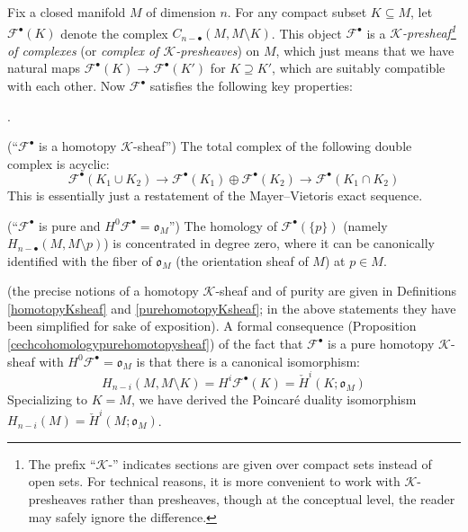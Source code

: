 \documentclass[12pt]{article}
\theoremstyle{definition}
\theoremstyle{remark}
\numberwithin{equation}{subsection}
\newcommand{\F}{\mathcal F}
\newcommand{\K}{\mathcal K}
\newcommand{\oo}{\mathfrak o}
\newcommand{\cH}{\check H}
\newcounter{rcounti}
\newenvironment{rlist}{\begin{list}{\roman{rcounti}.}{\usecounter{rcounti}
\setlength\itemsep{0pt}
\setlength\labelsep{4pt}
\setlength\labelwidth{16pt}
\setlength\leftmargin{32pt}
\setlength\listparindent{0pt}
\setlength\parsep{0pt}
\setlength\parskip{0pt}
\setlength\partopsep{0pt}
\setlength\rightmargin{0pt}
\setlength\topsep{0pt}
\setlength\itemindent{0pt}
}}{\end{list}}
\begin{document}
Fix a closed manifold $M$ of dimension $n$.  For any compact subset $K\subseteq M$, let $\F^\bullet(K)$ denote the complex $C_{n-\bullet}(M,M\setminus K)$.  This object $\F^\bullet$ is a \emph{$\K$-presheaf\footnote{The prefix ``$\K$-'' indicates sections are given over compact sets instead of open sets.  For technical reasons, it is more convenient to work with $\K$-presheaves rather than presheaves, though at the conceptual level, the reader may safely ignore the difference.} of complexes} (or \emph{complex of $\K$-presheaves}) on $M$, which just means that we have natural maps $\F^\bullet(K)\to\F^\bullet(K')$ for $K\supseteq K'$, which are suitably compatible with each other.  Now $\F^\bullet$ satisfies the following key properties:
\begin{rlist}
\item(``$\F^\bullet$ is a homotopy $\K$-sheaf'') The total complex of the following double complex is acyclic:
\begin{equation}
\F^\bullet(K_1\cup K_2)\to\F^\bullet(K_1)\oplus\F^\bullet(K_2)\to\F^\bullet(K_1\cap K_2)
\end{equation}
This is essentially just a restatement of the Mayer--Vietoris exact sequence.
\item(``$\F^\bullet$ is pure and $H^0\F^\bullet=\oo_M$'') The homology of $\F^\bullet(\{p\})$ (namely $H_{n-\bullet}(M,M\setminus p)$) is concentrated in degree zero, where it can be canonically identified with the fiber of $\oo_M$ (the orientation sheaf of $M$) at $p\in M$.
\end{rlist}
(the precise notions of a homotopy $\K$-sheaf and of purity are given in Definitions \ref{homotopyKsheaf} and \ref{purehomotopyKsheaf}; in the above statements they have been simplified for sake of exposition).  A formal consequence (Proposition \ref{cechcohomologypurehomotopysheaf}) of the fact that $\F^\bullet$ is a pure homotopy $\K$-sheaf with $H^0\F^\bullet=\oo_M$ is that there is a canonical isomorphism:
\begin{equation}\label{PDintropurehomotopysheafex}
H_{n-i}(M,M\setminus K)=H^i\F^\bullet(K)=\cH^i(K;\oo_M)
\end{equation}
Specializing to $K=M$, we have derived the Poincar\'e duality isomorphism $H_{n-i}(M)=\cH^i(M;\oo_M)$.
\end{document}
